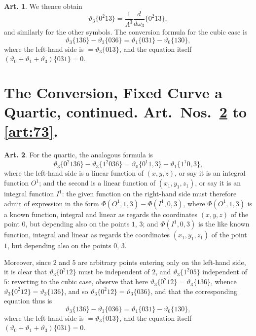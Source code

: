 \documentclass[12pt,a4paper]{article}
\theoremstyle{definition}
\newtheorem{art}{Art.}[section]
\begin{document}
\newpage
\begin{art}\label{art:63}
We thence obtain
\[
\vartheta_3\{0^2 13\} = \frac{1}{\Lambda^3}\frac{d}{d\omega_3}\{0^2 13\},
\]
and similarly for the other symbols. The conversion formula for the cubic case is
\[
\vartheta_3\{136\} - \vartheta_3\{036\} = \vartheta_1\{031\} - \vartheta_0\{130\},
\]
where the left-hand side is $= \vartheta_3\{013\}$, and the equation itself $(\vartheta_0 + \vartheta_1 + \vartheta_3)\{031\} = 0$.
\end{art}

\section*{The Conversion, Fixed Curve a Quartic, continued. Art.~Nos.~\ref{art:64} to \ref{art:73}.}

\begin{art}\label{art:64}
For the quartic, the analogous formula is
\[
\vartheta_3\{0^2 136\} - \vartheta_3\{1^2 036\} = \vartheta_0\{0^1 1, 3\} - \vartheta_1\{1^1 0, 3\},
\]
where the left-hand side is a linear function of $(x, y, z)$, or say it is an integral function $O^1$; and the second is a linear function of $(x_1, y_1, z_1)$, or say it is an integral function $I^1$: the given function on the right-hand side must therefore admit of expression in the form $\Phi(O^1, 1, 3) - \Phi(I^1, 0, 3)$, where $\Phi(O^1, 1, 3)$ is a known function, integral and linear as regards the coordinates $(x, y, z)$ of the point $0$, but depending also on the points $1$, $3$; and $\Phi(I^1, 0, 3)$ is the like known function, integral and linear as regards the coordinates $(x_1, y_1, z_1)$ of the point $1$, but depending also on the points $0$, $3$.
\end{art}

\newpage
Moreover, since $2$ and $5$ are arbitrary points entering only on the left-hand side, it is clear that $\vartheta_3\{0^2 12\}$ must be independent of $2$, and $\vartheta_3\{1^2 05\}$ independent of $5$: reverting to the cubic case, observe that here $\vartheta_3\{0^2 12\} = \vartheta_3\{136\}$, whence $\vartheta_3\{0^2 12\} = \vartheta_3\{136\}$, and so $\vartheta_3\{0^2 12\} = \vartheta_3\{036\}$, and that the corresponding equation thus is
\[
\vartheta_3\{136\} - \vartheta_3\{036\} = \vartheta_1\{031\} - \vartheta_0\{130\},
\]
where the left-hand side is $= \vartheta_3\{013\}$, and the equation itself $(\vartheta_0 + \vartheta_1 + \vartheta_3)\{031\} = 0$.
\end{document}
